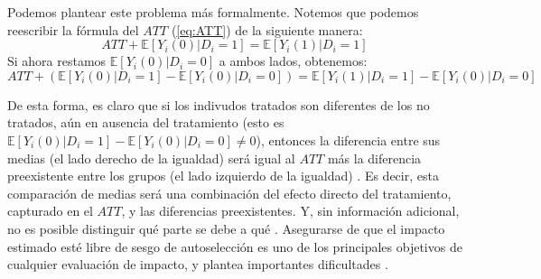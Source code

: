 \documentclass[../../main.tex]{subfiles}
\begin{document}
Podemos plantear este problema más formalmente. Notemos que podemos reescribir la fórmula
del \(ATT\) (\ref{eq:ATT}) de la siguiente manera:
\begin{equation}
    ATT + \mathbb{E} \left[Y_i(0)|D_i=1\right] = \mathbb{E} \left[Y_i(1)|D_i=1\right]
    \label{eq:ATT2}
\end{equation}
Si ahora restamos \(\mathbb{E} \left[Y_i(0)|D_i=0\right]\) a ambos lados, obtenemos:
\begin{equation}
    ATT + \left( \mathbb{E} \left[Y_i(0)|D_i=1\right] - \mathbb{E} \left[Y_i(0)|D_i=0\right] \right) =
    \mathbb{E} \left[Y_i(1)|D_i=1\right] - \mathbb{E} \left[Y_i(0)|D_i=0\right]\
    \label{eq:ATT3}
\end{equation}

De esta forma, es claro que si los indivudos tratados son diferentes de los no tratados,
aún en ausencia del tratamiento (esto es \(\mathbb{E} \left[Y_i(0)|D_i=1\right] -
\mathbb{E} \left[Y_i(0)|D_i=0\right] \neq 0\)), entonces la diferencia entre sus medias
(el lado derecho de la igualdad) será igual al \(ATT\) más la diferencia preexistente
entre los grupos (el lado izquierdo de la igualdad) \cite{bernal}. Es decir, esta
comparación de medias será una combinación del efecto directo del tratamiento, capturado
en el \(ATT\), y las diferencias preexistentes. Y, sin información adicional, no es
posible distinguir qué parte se debe a qué \cite{bernal}. Asegurarse de que el impacto
estimado esté libre de sesgo de autoselección es uno de los principales objetivos de
cualquier evaluación de impacto, y plantea importantes dificultades \cite{gertler-2016}.

\end{document}

